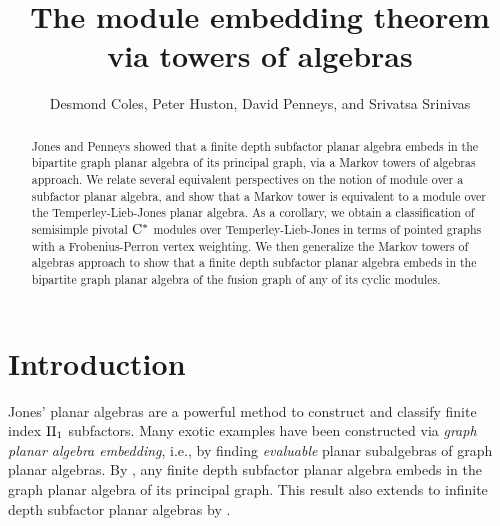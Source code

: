 \documentclass[11pt]{article}
\title{The module embedding theorem via towers of algebras}
\author{Desmond Coles, Peter Huston, David Penneys, and Srivatsa Srinivas}
\theoremstyle{plain}
\theoremstyle{definition}
\newcommand{\Cstar}{\rm{C^*}}
\begin{document}

\maketitle
\begin{abstract}
Jones and Penneys showed that a finite depth subfactor planar algebra embeds in the bipartite graph planar algebra of its principal graph, via a Markov towers of algebras approach.
 We relate several equivalent perspectives on the notion of module over a subfactor planar algebra, and show that a Markov tower is equivalent to a module over the Temperley-Lieb-Jones planar algebra.
 As a corollary, we obtain a classification of semisimple pivotal $\Cstar$ modules over Temperley-Lieb-Jones in terms of pointed graphs with a Frobenius-Perron vertex weighting.
 We then generalize the Markov towers of algebras approach to show that a finite depth subfactor planar algebra embeds in the bipartite graph planar algebra of the fusion graph of any of its cyclic modules.
\end{abstract}


\section{Introduction}

Jones' planar algebras \cite{math.QA/9909027} are a powerful method to construct \cite{MR2979509,1810.06076} and classify \cite{MR3166042,MR3345186,1509.00038} finite index ${\rm II}_1$ subfactors.
Many exotic examples have been constructed via \emph{graph planar algebra embedding}, i.e., by finding \emph{evaluable} planar subalgebras of graph planar algebras.
By \cite{MR2812459}, any finite depth subfactor planar algebra embeds in the graph planar algebra of its principal graph.
This result also extends to infinite depth subfactor planar algebras by \cite{gpa}.
\end{document}
